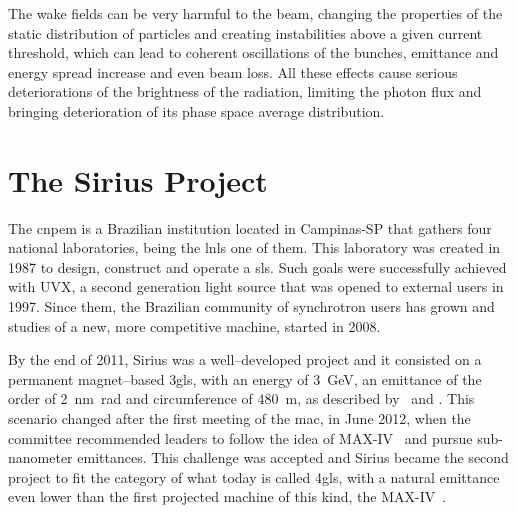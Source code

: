     The wake fields can be very harmful to the beam, changing the properties of the static distribution of particles and creating instabilities above a given current threshold, which can lead to coherent oscillations of the bunches, emittance and energy spread increase and even beam loss. All these effects cause serious deteriorations of the brightness of the radiation, limiting the photon flux and bringing deterioration of its phase space average distribution.

\section{The Sirius Project}

  	The \gls{cnpem} is a Brazilian institution located in Campinas-SP that gathers four national laboratories, being the \gls{lnls} one of them. This laboratory was created in 1987 to design, construct and operate a \gls{sls}. Such goals were successfully achieved with UVX, a second generation light source that was opened to external users in 1997. Since them, the Brazilian community of synchrotron users has grown and studies of a new, more competitive machine, started in 2008.

    By the end of 2011, Sirius was a well--developed project and it consisted on a permanent magnet--based \gls{3gls}, with an energy of \SI{3}{\giga\electronvolt}, an emittance of the order of \SI{2}{\nano\meter\radian} and circumference of \SI{480}{\meter}, as described by~ and . This scenario changed after the first meeting of the \gls{mac}, in June 2012, when the committee recommended leaders to follow the idea of MAX-IV~\cite{Leemann2009} and pursue sub-nanometer emittances. This challenge was accepted and Sirius became the second project to fit the category of what today is called \gls{4gls}, with a natural emittance even lower than the first projected machine of this kind, the MAX-IV~\cite{Liu2013}.

